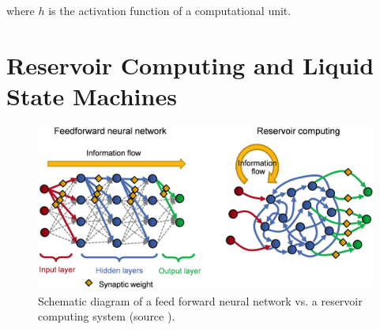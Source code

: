 where $h$ is the activation function of a computational unit.

\section{Reservoir Computing and Liquid State Machines}
\begin{figure}
	\centering
	\includegraphics[scale=0.1]{fig/neucube/reservoir.png}
	\caption{Schematic diagram of a feed forward neural network vs. a reservoir computing system (source \citet{ibm2018stefan}).}
	\label{fig:reservoir_feedforward}
\end{figure}

